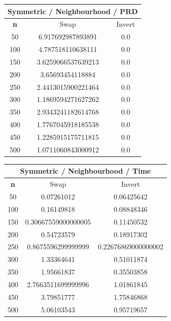\documentclass{article}
\begin{document}
\begin{center}
\begin{tabular}{|c|c|c|}
\hline
\multicolumn{3}{|c|}{\textbf{Symmetric / Neighbourhood / PRD}}\\
\hline
\textbf{n} & Swap & Invert\\
\hline
50 & 6.917692987893891 & 0.0\\
\hline
100 & 4.787518110638111 & 0.0\\
\hline
150 & 3.6259066537639213 & 0.0\\
\hline
200 & 3.65693454118884 & 0.0\\
\hline
250 & 2.4413015900221464 & 0.0\\
\hline
300 & 1.1869594271627262 & 0.0\\
\hline
350 & 2.9343241182614768 & 0.0\\
\hline
400 & 1.7767045918185538 & 0.0\\
\hline
450 & 1.2285915175711815 & 0.0\\
\hline
500 & 1.0711060843000912 & 0.0\\
\hline
\end{tabular}
\end{center}

\begin{center}
\begin{tabular}{|c|c|c|}
\hline
\multicolumn{3}{|c|}{\textbf{Symmetric / Neighbourhood / Time}}\\
\hline
\textbf{n} & Swap & Invert\\
\hline
50 & 0.07261012 & 0.06425642\\
\hline
100 & 0.16149818 & 0.08848346\\
\hline
150 & 0.30667559000000005 & 0.11450532\\
\hline
200 & 0.54723579 & 0.18917302\\
\hline
250 & 0.8675596299999999 & 0.22676869000000002\\
\hline
300 & 1.33364641 & 0.51011874\\
\hline
350 & 1.95661837 & 0.35503858\\
\hline
400 & 2.7663511699999996 & 1.01861845\\
\hline
450 & 3.79851777 & 1.75846868\\
\hline
500 & 5.06103543 & 0.95719657\\
\hline
\end{tabular}
\end{center}
\end{document}
